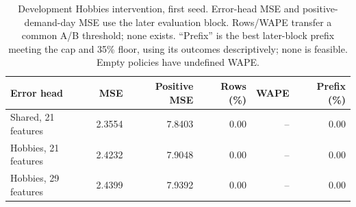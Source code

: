 \begin{table}[t]
\centering
\small
\setlength{\tabcolsep}{3pt}
\begin{tabular}{lrrrrr}
\toprule
Error head & MSE & Positive MSE & Rows (\%) & WAPE & Prefix (\%) \\
\midrule
Shared, 21 features & 2.3554 & 7.8403 & 0.00 & -- & 0.00 \\
Hobbies, 21 features & 2.4232 & 7.9048 & 0.00 & -- & 0.00 \\
Hobbies, 29 features & 2.4399 & 7.9392 & 0.00 & -- & 0.00 \\
\bottomrule
\end{tabular}
\caption{Development Hobbies intervention, first seed. Error-head MSE and positive-demand-day MSE use the later evaluation block. Rows/WAPE transfer a common A/B threshold; none exists. ``Prefix'' is the best later-block prefix meeting the cap and 35\% floor, using its outcomes descriptively; none is feasible. Empty policies have undefined WAPE.}
\label{tab:hobbies_intervention}
\end{table}

